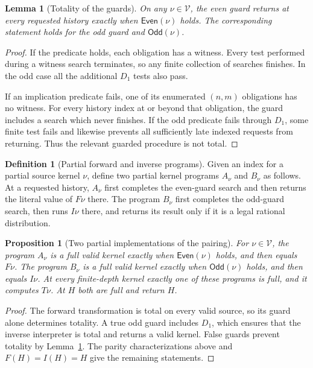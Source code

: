 \documentclass[11pt]{article}
\newtheorem{lemma}[theorem]{Lemma}
\newtheorem{proposition}[theorem]{Proposition}
\theoremstyle{definition}
\newtheorem{definition}{Definition}
\theoremstyle{remark}
\newcommand{\V}{\mathcal V}
\begin{document}
\begin{lemma}[Totality of the guards]
\label{lem:guards}
On any $\nu\in\V$, the even guard returns at every requested
history exactly when $\mathsf{Even}(\nu)$ holds.  The corresponding
statement holds for the odd guard and $\mathsf{Odd}(\nu)$.
\end{lemma}

\begin{proof}
If the predicate holds, each obligation has a witness.  Every test
performed during a witness search terminates, so any finite collection
of searches finishes.  In the odd case all the additional $D_1$
tests also pass.

If an implication predicate fails, one of its enumerated $(n,m)$
obligations has no witness.  For every history index at or beyond
that obligation, the guard includes a search which never finishes.
If the odd predicate fails through $D_1$, some finite test fails and
likewise prevents all sufficiently late indexed requests from
returning.  Thus the relevant guarded procedure is not total.
\end{proof}

\begin{definition}[Partial forward and inverse programs]
\label{def:partial-branches}
Given an index for a partial source kernel $\nu$, define two partial
kernel programs $A_\nu$ and $B_\nu$ as follows.  At a requested
history, $A_\nu$ first completes the even-guard search and then returns the
literal value of $F\nu$ there.  The program $B_\nu$ first completes the odd-guard search,
then runs $I\nu$ there, and returns its result only if it is a legal
rational distribution.
\end{definition}

\begin{proposition}[Two partial implementations of the pairing]
\label{prop:partial-pairing}
For $\nu\in\V$, the program $A_\nu$ is a full valid kernel exactly
when $\mathsf{Even}(\nu)$ holds, and then equals $F\nu$.  The program
$B_\nu$ is a full valid kernel exactly when $\mathsf{Odd}(\nu)$
holds, and then equals $I\nu$.  At every finite-depth kernel exactly
one of these programs is full, and it computes $T\nu$.  At $H$ both
are full and return $H$.
\end{proposition}

\begin{proof}
The forward transformation is total on every valid source, so its
guard alone determines totality.  A true odd guard includes $D_1$,
which ensures that the inverse interpreter is total and returns a
valid kernel.  False guards prevent totality by
Lemma~\ref{lem:guards}.  The parity characterizations above and
$F(H)=I(H)=H$ give the remaining statements.
\end{proof}
\end{document}
